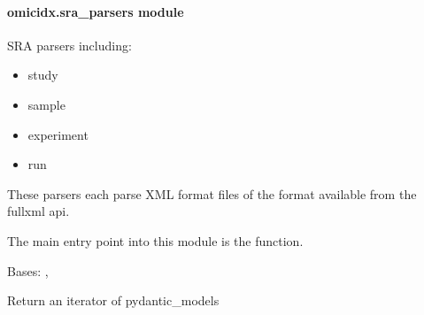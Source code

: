 \documentclass[letterpaper,10pt,english]{sphinxmanual}
\begin{document}
\paragraph{omicidx.sra\_parsers module}
\label{\detokenize{omicidx.sra_parsers:module-omicidx.sra_parsers}}\label{\detokenize{omicidx.sra_parsers:omicidx-sra-parsers-module}}\label{\detokenize{omicidx.sra_parsers::doc}}
SRA parsers including:
\begin{itemize}
\item {} 
study

\item {} 
sample

\item {} 
experiment

\item {} 
run

\end{itemize}

These parsers each parse XML format files of the format
available from the fullxml api.

The main entry point into this module is the 
function.

\begin{fulllineitems}
\label{\detokenize{omicidx.sra_parsers:omicidx.sra_parsers.LiveList}}
Bases: , 

Return an iterator of pydantic\_models

\end{fulllineitems}

\end{document}

